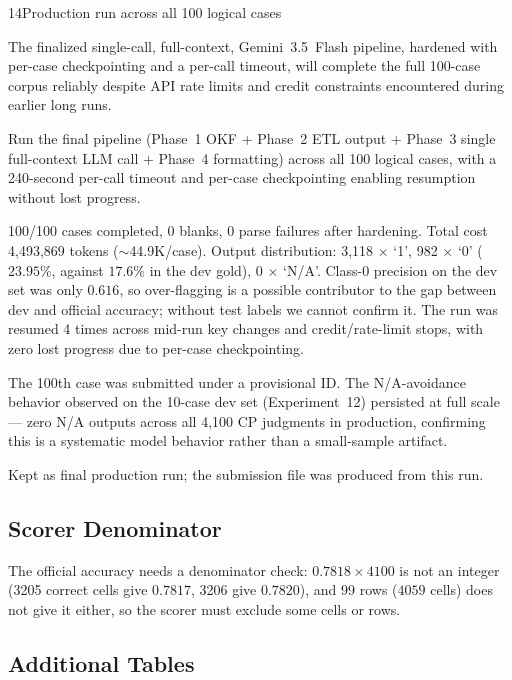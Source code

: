 \begin{explog}{14}{Production run across all 100 logical cases}
\item[Hypothesis] The finalized single-call, full-context, Gemini~3.5~Flash pipeline, hardened with per-case checkpointing and a per-call timeout, will complete the full 100-case corpus reliably despite API rate limits and credit constraints encountered during earlier long runs.
\item[Method] Run the final pipeline (Phase~1 OKF + Phase~2 ETL output + Phase~3 single full-context LLM call + Phase~4 formatting) across all 100 logical cases, with a 240-second per-call timeout and per-case checkpointing enabling resumption without lost progress.
\item[Result] 100/100 cases completed, 0 blanks, 0 parse failures after hardening. Total cost 4{,}493{,}869 tokens ($\sim$44.9K/case). Output distribution: 3{,}118 $\times$ `1', 982 $\times$ `0' ($23.95\%$, against $17.6\%$ in the dev gold), 0 $\times$ `N/A'. Class-0 precision on the dev set was only $0.616$, so over-flagging is a possible contributor to the gap between dev and official accuracy; without test labels we cannot confirm it. The run was resumed 4 times across mid-run key changes and credit/rate-limit stops, with zero lost progress due to per-case checkpointing.
\item[Inference] The 100th case was submitted under a provisional ID. The N/A-avoidance behavior observed on the 10-case dev set (Experiment~12) persisted at full scale --- zero N/A outputs across all 4{,}100 CP judgments in production, confirming this is a systematic model behavior rather than a small-sample artifact.
\item[Verdict] Kept as final production run; the submission file was produced from this run.
\end{explog}



\subsection{Scorer Denominator}

The official accuracy needs a denominator check: $0.7818\times4100$ is not an integer
(3205 correct cells give $0.7817$, 3206 give $0.7820$), and 99 rows ($4059$ cells) does
not give it either, so the scorer must exclude some cells or rows.

\subsection{Additional Tables}

